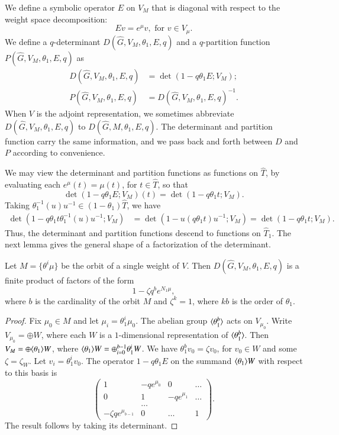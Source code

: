 We define a symbolic operator $E$ on $V_M$ that is diagonal with
respect to the weight space decomposition:
\[
E v = e^{\mu} v, \text{ for } v \in V_\mu.
\]
We define a $q$-determinant $D(\hat G,V_M,\theta_1,E,q)$ and a
$q$-partition function $P(\hat G,V_M,\theta_1,E,q)$ as
\begin{align}\label{eqn:det}
D(\hat G,V_M,\theta_1,E,q) &= \det(1- q \theta_1 E;V_M);\\ 
P(\hat G,V_M,\theta_1,E,q) &= D(\hat G,V_M,\theta_1,E,q)^{-1}.
\end{align}
When $V$ is the adjoint representation, we sometimes abbreviate
$D(\hat G,V_M,\theta_1,E,q)$ to $D(\hat G,M,\theta_1,E,q)$.
The determinant and partition function carry the same information,
and we pass back and forth between $D$ and $P$ according to convenience.


We may view the determinant and partition functions as functions on
$\hat T$, by evaluating each $e^\mu (t) = \mu(t)$, for $t\in \hat T$,
so that
\[
\det(1- q\theta_1 E;V_M)(t) = \det(1-q\theta_1 t;V_M).
\]
Taking $\theta_1^{-1}(u) u^{-1}\in (1-\theta_1)\hat T$, we have
\begin{align*}
\det (1-q \theta_1 t \theta_1^{-1}(u) u^{-1};V_M) 
&= \det(1- u (q \theta_1 t ) u^{-1};V_M) = \det(1-q\theta_1 t;V_M).
\end{align*}
Thus, the determinant and partition functions descend to functions on
$\hat T_1$.  The next lemma gives the general shape of a factorization
of the determinant.

\begin{lemma}\label{lemma:fact}  
  Let $M = \{\theta^i\mu\}$ be the orbit of a single weight of $V$.
  Then $D(\hat G,V_M,\theta_1,E,q)$ is a finite product of factors of
  the form
\[
1 - \zeta q^b e^{N_1\mu},
\]
where $b$ is the cardinality of the orbit $M$ and $\zeta^k=1$, where
$k b$ is the order of $\theta_1$.
\end{lemma}

\begin{proof} Fix $\mu_0\in M$ and let $\mu_i = \theta_1^i \mu_0$.
  The abelian group $\langle{\theta_1^b}\rangle$ acts on $V_{\mu_0}$.  Write
  $V_{\mu_0} = \oplus W$, where each $W$ is a $1$-dimensional
  representation of $\langle{\theta_1^b}\rangle$.  Then $V_M = \oplus
  \langle{\theta_1}\rangle W$, where $\langle{\theta_1}\rangle W = \oplus_{i=0}^{b-1}
  \theta_1^i W$.  We have $\theta_1^b v_0 = \zeta v_0$, for $v_0\in W$
  and some $\zeta = \zeta_W$.  Let $v_i = \theta_1^i v_0$.  The
  operator $1 - q \theta_1 E$ on the summand $\langle{\theta_1}\rangle W$ with
  respect to this basis is
\[
\begin{pmatrix}
1 & -q e^{\mu_0} & 0 & \ldots\\
0 & 1 & -q e^{\mu_1} & \ldots\\
   & \ldots & & \\
-\zeta  q e^{\mu_{b-1}} & 0 & \ldots & 1
\end{pmatrix}.
\]
The result follows by taking its determinant.
\end{proof}

